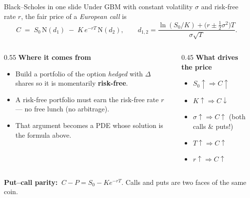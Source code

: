 \documentclass[11pt,aspectratio=169]{beamer}
\newcommand{\Ncdf}{\mathrm{N}}             %
\newcommand{\call}{C}
\newcommand{\putt}{P}
\newcommand{\strike}{K}
\newcommand{\und}{S}                         %
\newcommand{\keybox}[1]{%
  \begin{beamercolorbox}[wd=\textwidth,sep=0.6em,rounded=true]{}%
    \colorbox{soft}{\parbox{\dimexpr\textwidth-1.4em}{\color{ink}#1}}%
  \end{beamercolorbox}}
\begin{document}
\begin{frame}{Black--Scholes in one slide}
  Under GBM with constant volatility $\sigma$ and risk-free rate $r$, the
  fair price of a \emph{European call} is
  \[
    \call \;=\; \und_0\,\Ncdf(d_1)\;-\;\strike\,e^{-rT}\,\Ncdf(d_2),
    \qquad
    d_{1,2}=\frac{\ln(\und_0/\strike)+\big(r\pm\tfrac12\sigma^2\big)T}{\sigma\sqrt{T}} .
  \]
  \begin{columns}[T]
    \begin{column}{0.55\textwidth}
      \textbf{Where it comes from}
      \begin{itemize}\small
        \item Build a portfolio of the option \emph{hedged} with $\Delta$ shares so it is momentarily \textbf{risk-free}.
        \item A risk-free portfolio must earn the risk-free rate $r$ — no free lunch (\alert{no arbitrage}).
        \item That argument becomes a PDE whose solution is the formula above.
      \end{itemize}
    \end{column}
    \begin{column}{0.45\textwidth}
      \textbf{What drives the price}
      \begin{itemize}\small
        \item $\und_0\uparrow \Rightarrow \call\uparrow$
        \item $\strike\uparrow \Rightarrow \call\downarrow$
        \item $\sigma\uparrow \Rightarrow \call\uparrow$ (both calls \& puts!)
        \item $T\uparrow \Rightarrow \call\uparrow$
        \item $r\uparrow \Rightarrow \call\uparrow$
      \end{itemize}
    \end{column}
  \end{columns}
  \vspace{0.2em}
  \keybox{\textbf{Put--call parity:} $\ \call-\putt=\und_0-\strike e^{-rT}$. Calls and puts are two faces of the same coin.}
\end{frame}
\end{document}
